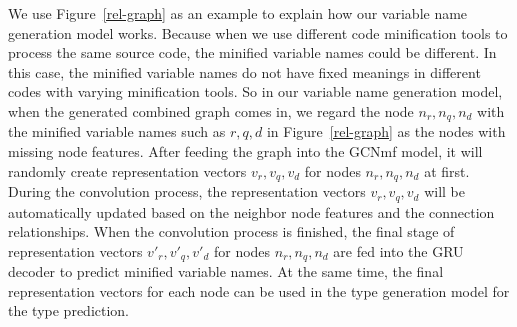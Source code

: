 We use Figure~\ref{rel-graph} as an example to explain how our variable name generation model works. Because when we use different code minification tools to process the same source code, the minified variable names could be different. In this case, the minified variable names do not have fixed meanings in different codes with varying minification tools. So in our variable name generation model, when the generated combined graph comes in, we regard the node $n_r, n_q, n_d$ with the minified variable names such as $r, q, d$ in Figure~\ref{rel-graph} as the nodes with missing node features. After feeding the graph into the GCNmf model, it will randomly create representation vectors $v_r, v_q, v_d$ for nodes $n_r, n_q, n_d$ at first. During the convolution process, the representation vectors $v_r, v_q, v_d$ will be automatically updated based on the neighbor node features and the connection relationships. When the convolution process is finished, the final stage of representation vectors $v'_r, v'_q, v'_d$ for nodes $n_r, n_q, n_d$ are fed into the GRU decoder to predict minified variable names. At the same time, the final representation vectors for each node can be used in the type generation model for the type prediction.